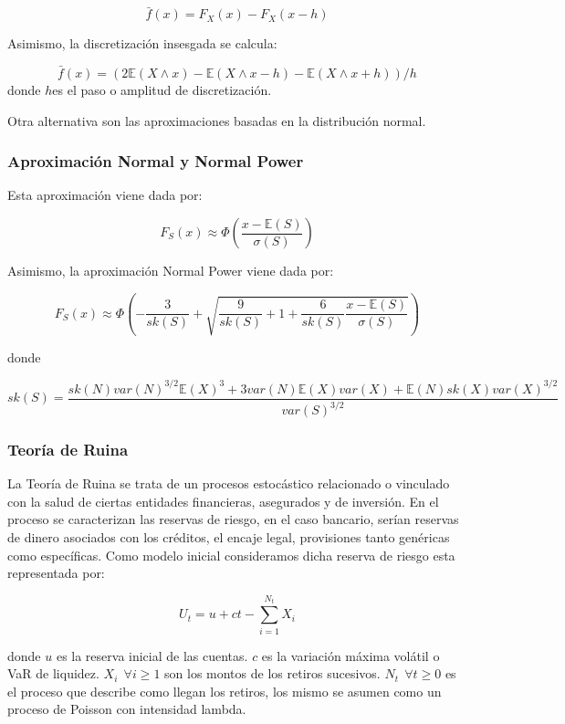 \documentclass[]{article}
\begin{document}
\[\bar{f}(x)=F_X(x)-F_X(x-h)\]

Asimismo, la discretización insesgada se calcula:

\[\bar{f}(x)=(2\mathbb{E}(X\wedge x)-\mathbb{E}(X\wedge x-h)-\mathbb{E}(X \wedge x+h))/h\]
donde \(h\)es el paso o amplitud de discretización.

Otra alternativa son las aproximaciones basadas en la distribución
normal.

\hypertarget{aproximacion-normal-y-normal-power}{%
\subsubsection{Aproximación Normal y Normal
Power}\label{aproximacion-normal-y-normal-power}}

Esta aproximación viene dada por:

\[F_S(x) \approx \Phi\left(\frac{x-\mathbb{E}(S)}{\sigma(S)}\right)\]

Asimismo, la aproximación Normal Power viene dada por:

\[F_S(x) \approx \Phi\left(-\frac{3}{sk(S)}+\sqrt{\frac{9}{sk(S)}+1+\frac{6}{sk(S)}\frac{x-\mathbb{E}(S)}{\sigma(S)}}\right)\]

donde

\[sk(S)=\frac{sk(N)var(N)^{3/2}\mathbb{E}(X)^3+3var(N)\mathbb{E}(X)var(X)+ \mathbb{E}(N)sk(X)var(X)^{3/2}}{var(S)^{3/2}}\]

\hypertarget{teoria-de-ruina}{%
\subsubsection{Teoría de Ruina}\label{teoria-de-ruina}}

La Teoría de Ruina se trata de un procesos estocástico relacionado o
vinculado con la salud de ciertas entidades financieras, asegurados y de
inversión. En el proceso se caracterizan las reservas de riesgo, en el
caso bancario, serían reservas de dinero asociados con los créditos, el
encaje legal, provisiones tanto genéricas como específicas. Como modelo
inicial consideramos dicha reserva de riesgo esta representada por:

\[U_t=u+ct-\sum_{i=1}^{N_t}X_i\]

donde \(u\) es la reserva inicial de las cuentas. \(c\) es la variación
máxima volátil o VaR de liquidez. \(X_i~~\forall i \geq1\) son los
montos de los retiros sucesivos. \(N_t~~\forall t \geq0\) es el proceso
que describe como llegan los retiros, los mismo se asumen como un
proceso de Poisson con intensidad lambda.
\end{document}
